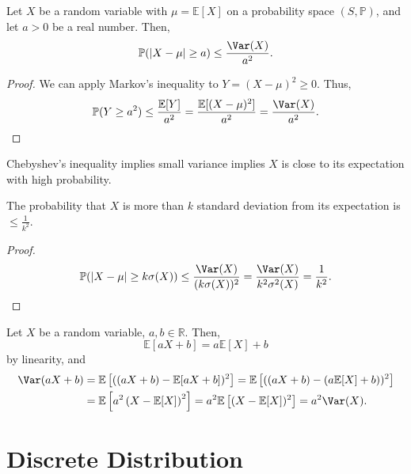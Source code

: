 \begin{theorem}
    Let \(X\) be a random variable with \(\mu = \mathbb{E} [X]\) on a probability space \((S, \mathbb{P} )\), and let \(a > 0\) be a real number. Then,
    \[
        \mathbb{P} (\vert X - \mu \vert \ge a) \le \frac{\Var(X)}{a^2}.
    \]    
\end{theorem}

\begin{proof}
    We can apply Markov's inequality to \(Y = (X - \mu)^2 \ge 0\). Thus,
    \[
        \mathbb{P} (Y \ge a^2) \le \frac{\mathbb{E} [Y]}{a^2} = \frac{\mathbb{E} [(X - \mu )^2]}{a^2} = \frac{\Var(X)}{a^2}.
    \] 
\end{proof}

\begin{remark}
    Chebyshev's inequality implies small variance implies \(X\) is close to its expectation with high probability. 
\end{remark}

\begin{corollary}
    The probability that \(X\) is more than \(k\) standard deviation from its expectation is \(\le \frac{1}{k^2}\).   
\end{corollary}
\begin{proof}
    \begin{align*}
        \mathbb{P} (\vert X - \mu  \vert \ge k \sigma (X) ) \le \frac{\Var(X)}{(k \sigma (X))^2} = \frac{\Var(X)}{k^2 \sigma ^2(X)} = \frac{1}{k^2}.
    \end{align*}
\end{proof}

\begin{observation}
    Let \(X\) be a random variable, \(a, b \in \mathbb{R}\). Then, 
    \[
        \mathbb{E} [aX + b] = a \mathbb{E} [X] + b
    \] by linearity, and 
    \begin{align*}
        \Var(aX + b) &= \mathbb{E} \left[ ((aX+b) - \mathbb{E} [aX+b])^2 \right] = \mathbb{E} \left[ ((aX + b) - (a\mathbb{E} [X] + b))^2 \right] \\
        &= \mathbb{E} \left[ a^2 \left( X - \mathbb{E} [X] \right)^2  \right] = a^2 \mathbb{E} \left[ (X - \mathbb{E} [X])^2 \right] = a^2 \Var(X).  
    \end{align*} 
\end{observation}

\section{Discrete Distribution}
